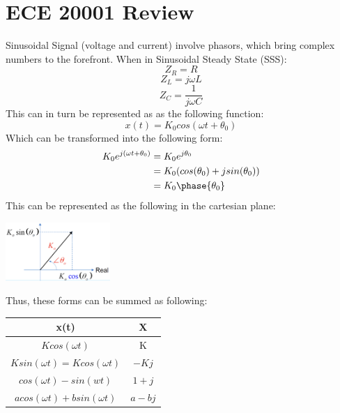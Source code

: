 \documentclass[nobib]{tufte-handout}
\begin{document}
\section{ECE 20001 Review}
Sinusoidal Signal (voltage and current) involve phasors, which bring complex
numbers to the forefront. When in Sinusoidal Steady State (SSS):\\
\begin{equation*}
    Z_R=R
\end{equation*}
\begin{equation*}
    Z_L=j\omega L
\end{equation*}
\begin{equation*}
    Z_C=\frac{1}{j\omega C}
\end{equation*}
This can in turn be represented as as the following function:\\
\begin{equation*}
    x(t)=K_0 cos(\omega t + \theta_0)
\end{equation*}
Which can be transformed into the following form:\\
\begin{align*}
    K_0 e^{j(\omega t + \theta_0)} & = K_0 e^{j \theta_0}                    \\
                                   & = K_0 (cos(\theta_0) + j sin(\theta_0)) \\
                                   & = K_0\phase{\theta_0}
\end{align*}
This can be represented as the following in the cartesian plane:\\
\begin{center}
    \includegraphics[width = 150px]{images/Screenshot 2024-01-08 155954.png}
\end{center}
Thus, these forms can be summed as following:\\
\begin{table}
    \centering
    \begin{tabular}{c|c}
        x(t)                                & $\mathbf{X}$ \\
        \hline
        $K cos(\omega t)$                   & K            \\
        $K sin(\omega t) = K cos(\omega t)$ & $-Kj$        \\
        $cos(\omega t) - sin(wt)$           & $1+j$        \\
        $a cos(\omega t) + b sin(\omega t)$ & $a-bj$
    \end{tabular}
\end{table}
\end{document}

